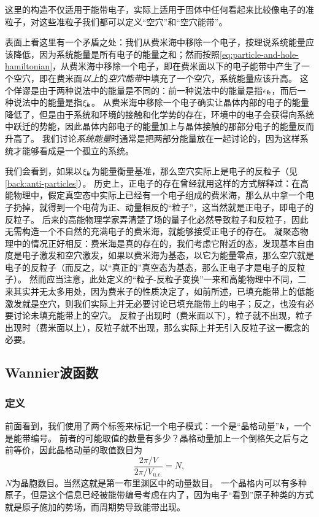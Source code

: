 这里的构造不仅适用于能带电子，实际上适用于固体中任何看起来比较像电子的准粒子，对这些准粒子我们都可以定义“空穴”和“空穴能带”。

表面上看这里有一个矛盾之处：我们从费米海中移除一个电子，按理说系统能量应该降低，因为系统能量是所有电子的能量之和；然而按照\eqref{eq:particle-and-hole-hamiltonian}，从费米海中移除一个电子，即在费米面以下的电子能带中产生了一个空穴，即在费米面\emph{以上}的\emph{空穴能带}中填充了一个空穴，系统能量应该升高。
这个佯谬是由于两种说法中的能量是不同的：前一种说法中的能量是指$\epsilon_{\vb*{k}}$，而后一种说法中的能量是指$\xi_{\vb*{k}}$。
从费米海中移除一个电子确实让晶体内部的电子的能量降低了，但是由于系统和环境的接触和化学势的存在，环境中的电子会获得向系统中跃迁的势能，因此晶体内部电子的能量加上与晶体接触的那部分电子的能量反而升高了。
我们讨论\emph{系统能量}时通常是把两部分能量放在一起讨论的，因为这样系统才能够看成是一个孤立的系统。

我们会看到，如果以$\xi_{\vb*{k}}$为能量衡量基准，那么空穴实际上是电子的反粒子（见\autoref{back:anti-particles}）。
历史上，正电子的存在曾经就用这样的方式解释过：在高能物理中，假定真空态中实际上已经有一个电子组成的费米海，那么从中拿一个电子扔掉，就得到一个电荷为正、动量相反的“粒子”，这当然就是正电子，即电子的反粒子。
后来的高能物理学家弄清楚了场的量子化必然导致粒子和反粒子，因此无需构造一个不自然的充满电子的费米海，就能够接受正电子的存在。
凝聚态物理中的情况正好相反：费米海是真的存在的，我们考虑它附近的态，发现基本自由度是电子激发和空穴激发，如果以费米海为基态，以它为能量零点，那么空穴就是电子的反粒子（而反之，以“真正的”真空态为基态，那么正电子才是电子的反粒子）。
然而应当注意，此处定义的“粒子-反粒子变换”一来和高能物理中不同，二来其实并无太多用处，因为费米子的性质决定了，如前所述，已填充能带上的低能激发就是空穴，则我们实际上并无必要讨论已填充能带上的电子；反之，也没有必要讨论未填充能带上的空穴。
反粒子出现时（费米面以下），粒子就不出现，粒子出现时（费米面以上），反粒子就不出现，那么实际上并无引入反粒子这一概念的必要。

\subsection{Wannier波函数}

\subsubsection{定义}

前面看到，我们使用了两个标签来标记一个电子模式：一个是“晶格动量”$\vb*{k}$，一个是能带编号。
前者的可能取值的数量有多少？晶格动量加上一个倒格矢之后与之前等价，因此晶格动量的取值数目为
\[
    \frac{2\pi / V}{2\pi / V_\text{u.c.}} = N,
\]
$N$为晶胞数目。当然这就是第一布里渊区中的动量数目。
一个晶格内可以有多种原子，但是这个信息已经被能带编号考虑在内了，因为电子“看到”原子种类的方式就是原子施加的势场，而周期势导致能带出现。

